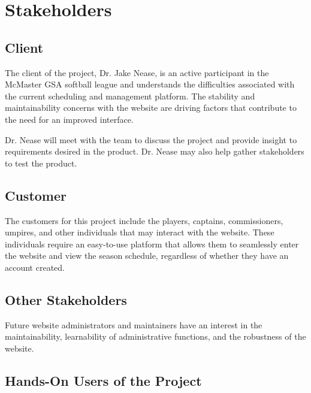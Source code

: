 \documentclass[12pt]{article}
\begin{document}
\section{Stakeholders}
\subsection{Client}

The client of the project, Dr. Jake Nease, is an active participant in the
McMaster GSA softball league and understands the difficulties associated with
the current scheduling and management platform. The stability and maintainability
concerns with the website are driving factors that contribute to the need for
an improved interface.

Dr. Nease will meet with the team to discuss the project and provide insight
to requirements desired in the product. Dr. Nease may also help gather
stakeholders to test the product.

\subsection{Customer}

The customers for this project include the players, captains, commissioners,
umpires, and other individuals that may interact with the website. These
individuals require an easy-to-use platform that allows them to seamlessly
enter the website and view the season schedule, regardless of whether they have an
account created. 

\subsection{Other Stakeholders}

Future website administrators and maintainers have an interest in the
maintainability, learnability of administrative functions, and the robustness
of the website.

\subsection{Hands-On Users of the Project}
\end{document}
